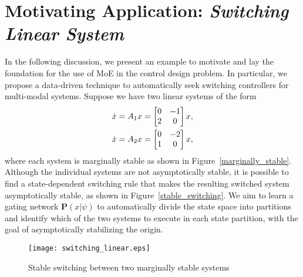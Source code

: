 \section{Motivating Application: \textit{Switching Linear System}}
\label{sec:motiviational_application}

In the following discussion, we present an example to motivate and lay
the foundation for the use of MoE in the control design problem. 
%
In particular, we propose a data-driven technique to automatically seek
switching controllers for multi-modal systems.
%  
Suppose we have two linear systems of the form 
\begin{equation}
    \begin{gathered}
        \dot{x} = A_1x = \begin{bmatrix}0 & -1 \\ 2 & 0\end{bmatrix}x, \\
        \dot{x} = A_2x = \begin{bmatrix}0 & -2 \\ 1 & 0\end{bmatrix}x,
    \end{gathered}
    \label{eq:unstable_closedloop}
\end{equation}
\noindent where each system is marginally stable as shown in
Figure~\ref{marginally_stable}.
%
Although the individual systems are not asymptotically stable, it is possible to
find a state-dependent switching rule that makes the resulting switched system
asymptotically stable, as shown in
Figure~\ref{stable_switching}\cite{liberzon2003switching}. 
%
We aim to learn a gating network $\mathbf{P}(x|\psi)$ to automatically divide
the state space into partitions and identify which of the two systems to execute
in each state partition, with the goal of asymptotically stabilizing the origin.
%
\begin{figure}[tb]
    \centering
    \texttt{[image: switching\_linear.eps]}
    \caption{Stable switching between two marginally stable systems }
    \label{fig:stableSwitching}
\end{figure}

